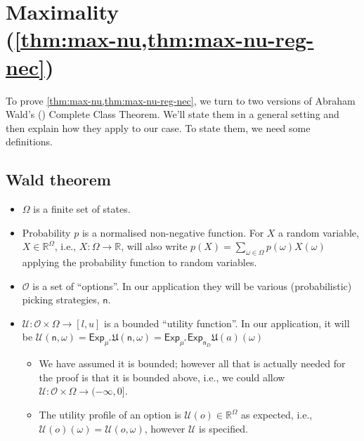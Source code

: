\documentclass[a4paper]{article}
\newcommand\Exp{\mathsf{Exp}}
\renewcommand\O{\mathcal{O}}
\newcommand\U{\mathfrak{U}} %
\newcommand\Uwald{\mathcal{U}} %
\newcommand{\n}{\mathsf{n}}
\renewcommand{\Re}{\mathbb{R}}
\newenvironment{CCM rewritten}
{\begingroup\color{blue}} %
{\endgroup}              %
\begin{document}
\section{Maximality \\(\cref{thm:max-nu,thm:max-nu-reg-nec})}
To prove \cref{thm:max-nu,thm:max-nu-reg-nec}, we turn to two versions of Abraham Wald's (\citeyear{wald1947cct}) Complete Class Theorem. 
We'll state them in a general setting and then explain how they apply to our case. To state them, we need some definitions.
\subsection{Wald theorem}


\begin{itemize}
	\item $\Omega$ is a finite set of states.
	\item Probability $p$ is a normalised non-negative function. For $X$ a random variable, $X\in\Re^\Omega$, i.e., $X:\Omega\to\Re$, will also write $p(X)=\sum_{\omega\in\Omega}p(\omega)X(\omega)$ applying the probability function to random variables. 
	\item $\O$ is a set of ``options''. In our application they will be various (probabilistic) picking strategies, $\n$.
	\item $\Uwald:\O\times\Omega\to [l,u]$ is a bounded ``utility function''. In our application, it will be $\Uwald(\n,\omega)=\Exp_{\mu^*}\U(\n,\omega)=\Exp_{\mu^*}\Exp_{\n_D}\U(a)(\omega)$ \begin{itemize}
		\item We have assumed it is bounded; however all that is actually needed for the proof is that it is bounded above, i.e., we could allow $\Uwald:\O\times\Omega\to (-\infty,0]$. 
		\item The utility profile of an option is $\Uwald(o)\in\Re^\Omega$ as expected, i.e., $\Uwald(o)(\omega)=\Uwald(o,\omega)$, however $\Uwald$ is specified. 
	\end{itemize}
\end{itemize}
\end{document}
